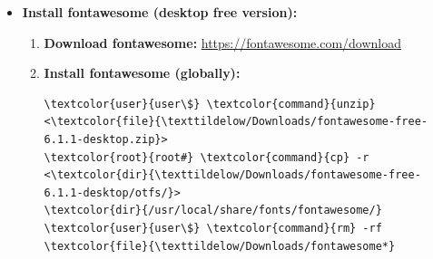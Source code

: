 \documentclass[10pt, a4paper, onecolumn, oneside, titlepage, openany]{book}
\begin{document}
\begin{itemize}
\begin{enumerate}
\begin{Verbatim}[commandchars=\\\{\}]
\textcolor{user}{user\$} \textcolor{command}{mkdir} <\textcolor{dir}{\texttildelow/.local/share/fonts/}>
\textcolor{root}{root#} \textcolor{command}{mkdir} <\textcolor{dir}{/usr/local/share/fonts/}>
\end{Verbatim}
        \item \textbf{Download font (TTF or OTF).}
        \item \textbf{Move font to the directory:}
        \begin{itemize}
            \item \textbf{Global:}
\begin{Verbatim}[commandchars=\\\{\}]
\textcolor{root}{root#} \textcolor{command}{mv} <\textcolor{file}{FONT}> <\textcolor{dir}{/usr/local/share/fonts/}>
\end{Verbatim}
            \item \textbf{Local:}
\begin{Verbatim}[commandchars=\\\{\}]
\textcolor{user}{user\$} \textcolor{command}{mv} <\textcolor{file}{FONT}> <\textcolor{dir}{\texttildelow/.local/share/fonts/}>
\end{Verbatim}
        \end{itemize}
    \end{enumerate}
    \item \textbf{Install fontawesome (desktop free version):}
    \begin{enumerate}
        \item \textbf{Download fontawesome:}
\newline \url{https://fontawesome.com/download}
        \item \textbf{Install fontawesome (globally):}
\begin{Verbatim}[commandchars=\\\{\}]
\textcolor{user}{user\$} \textcolor{command}{unzip} <\textcolor{file}{\texttildelow/Downloads/fontawesome-free-6.1.1-desktop.zip}>
\textcolor{root}{root#} \textcolor{command}{cp} -r <\textcolor{dir}{\texttildelow/Downloads/fontawesome-free-6.1.1-desktop/otfs/}>
\textcolor{dir}{/usr/local/share/fonts/fontawesome/}
\textcolor{user}{user\$} \textcolor{command}{rm} -rf \textcolor{file}{\texttildelow/Downloads/fontawesome*}
\end{Verbatim}
    \end{enumerate}
\end{itemize}
\end{document}
